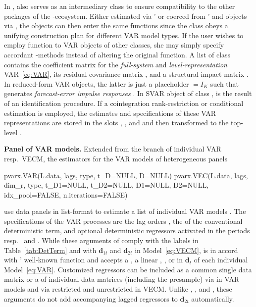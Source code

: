 In ,  also serves as an intermediary class to ensure compatibility to the other packages of the -ecosystem. Either estimated via '  or coerced from '  and  objects via , the  objects can then enter the same functions since the class obeys a unifying construction plan for different VAR model types. If the user wishes to employ  function to VAR objects of other classes, she may simply specify accordant -methods instead of altering the original  function. 
A list of class  contains the coefficient matrix  for the \textit{full-system} and \textit{level-representation} VAR~\eqref{eq:VAR}, its residual covariance matrix , and a structural impact matrix . In reduced-form VAR objects, the latter is just a placeholder  $ = I_K $ such that  generates \textit{forecast-error impulse responses} \cite[p.~52]{Lutkepohl2005}. In SVAR object of class ,  is the result of an identification procedure. If a cointegration rank-restriction or conditional estimation is employed, the estimates and specifications of these VAR representations are stored in the slots , , and  and then transformed to the top-level .


\textbf{Panel of VAR models.} Extended from the branch of individual VAR resp.~VECM, the estimators for the VAR models of heterogeneous panels
\begin{CodeChunk}
\begin{CodeInput}
pvarx.VAR(L.data, lags, type, t_D=NULL, D=NULL)
pvarx.VEC(L.data, lags, dim_r, type, t_D1=NULL, t_D2=NULL, 
          D1=NULL, D2=NULL, idx_pool=FALSE, n.iterations=FALSE)
\end{CodeInput}
\end{CodeChunk}
use data panels in list-format  to estimate a list of individual VAR models . The specifications of the VAR processes are the lag orders , the  of the conventional deterministic term, and optional deterministic regressors activated in the periods  resp.~ and . While these arguments of  comply with the labels in Table~\ref{tab:DetTerm} and with $ \boldsymbol{d}_{1t} $ and $ \boldsymbol{d}_{2t} $ in Model~\eqref{eq:VECM},  is in accord with ' well-known  function and accepts a , a linear , , or  in $ \boldsymbol{d}_{t} $ of each individual Model~\eqref{eq:VAR}. Customized regressors can be included as a common single data matrix or a  of individual data matrices (including the presample) via  in VAR models and via restricted  and unrestricted  in VECM. Unlike , , and , these arguments do not add accompanying lagged regressors to $ \boldsymbol{d}_{2t} $ automatically.
 
